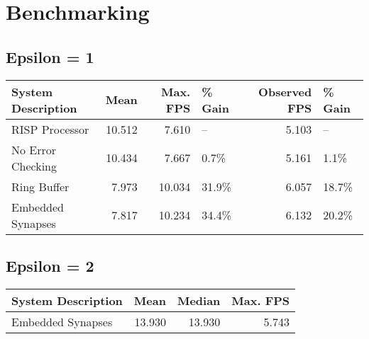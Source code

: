 \documentclass[conference]{IEEEtran}{}
\begin{document}
\section{Benchmarking}
\label{sec:org2bf42ea}
\subsection{Epsilon = 1}
\label{sec:orgc9b428d}
\begin{center}
\begin{tabular}{l|r|r|l|r|l}
System Description & Mean & Max. FPS & \% Gain & Observed FPS & \% Gain\\
\hline
RISP Processor & 10.512 & 7.610 & -- & 5.103 & --\\
No Error Checking & 10.434 & 7.667 & 0.7\% & 5.161 & 1.1\%\\
Ring Buffer & 7.973 & 10.034 & 31.9\% & 6.057 & 18.7\%\\
Embedded Synapses & 7.817 & 10.234 & 34.4\% & 6.132 & 20.2\%\\
\end{tabular}
\end{center}
\subsection{Epsilon = 2}
\label{sec:org2d2732a}
\begin{center}
\begin{tabular}{l|r|r|r}
System Description & Mean & Median & Max. FPS\\
\hline
Embedded Synapses & 13.930 & 13.930 & 5.743\\
\end{tabular}
\end{center}
\end{document}
